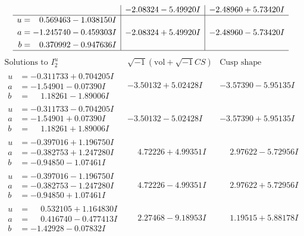 \documentclass[1p]{elsarticle_modified}
\theoremstyle{definition}
\newcommand{\I}{\sqrt{-1}}
\begin{document}
$$\begin{array}{c|c|c}
 & -2.08324 - 5.49920 I & -2.48960 + 5.73420 I \\ \hline\begin{aligned}
u &= \phantom{-}0.569463 - 1.038150 I \\
a &= -1.245740 - 0.459303 I \\
b &= \phantom{-}0.370992 - 0.947636 I\end{aligned}
 & -2.08324 + 5.49920 I & -2.48960 - 5.73420 I\\
 \hline 
 \end{array}$$\newpage$$\begin{array}{c|c|c}  
\text{Solutions to }I^u_{2}& \I (\text{vol} + \sqrt{-1}CS) & \text{Cusp shape}\\
 \hline 
\begin{aligned}
u &= -0.311733 + 0.704205 I \\
a &= -1.54901 - 0.07390 I \\
b &= \phantom{-}1.18261 - 1.89006 I\end{aligned}
 & -3.50132 + 5.02428 I & -3.57390 - 5.95135 I \\ \hline\begin{aligned}
u &= -0.311733 - 0.704205 I \\
a &= -1.54901 + 0.07390 I \\
b &= \phantom{-}1.18261 + 1.89006 I\end{aligned}
 & -3.50132 - 5.02428 I & -3.57390 + 5.95135 I \\ \hline\begin{aligned}
u &= -0.397016 + 1.196750 I \\
a &= -0.382753 + 1.247280 I \\
b &= -0.94850 - 1.07461 I\end{aligned}
 & \phantom{-}4.72226 + 4.99351 I & \phantom{-}2.97622 - 5.72956 I \\ \hline\begin{aligned}
u &= -0.397016 - 1.196750 I \\
a &= -0.382753 - 1.247280 I \\
b &= -0.94850 + 1.07461 I\end{aligned}
 & \phantom{-}4.72226 - 4.99351 I & \phantom{-}2.97622 + 5.72956 I \\ \hline\begin{aligned}
u &= \phantom{-}0.532105 + 1.164830 I \\
a &= \phantom{-}0.416740 - 0.477413 I \\
b &= -1.42928 - 0.07832 I\end{aligned}
 & \phantom{-}2.27468 - 9.18953 I & \phantom{-}1.19515 + 5.88178 I \\ \hline\begin{aligned}

\end{aligned}
\end{array}$$
\end{document}
